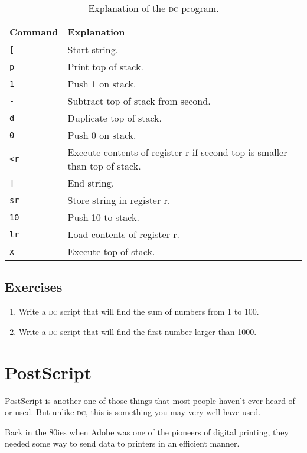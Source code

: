 \documentclass[a4paper,twocolumn]{article}
\begin{document}
\begin{table}[!h]
\centering
\caption{Explanation of the \textsc{dc} program.}\label{tlb:dcloop}
\begin{tabular}{@{}lp{5.7cm}@{}}
\toprule
Command & Explanation \\
\midrule
\verb|[| & Start string.\\
\verb|p| & Print top of stack.\\
\verb|1| & Push 1 on stack.\\
\verb|-| & Subtract top of stack from second.\\
\verb|d| & Duplicate top of stack.\\
\verb|0| & Push 0 on stack.\\
\verb|<r| & Execute contents of register r if second top is smaller than top of stack.\\
\verb|]| & End string.\\
\verb|sr| & Store string in register r.\\
\verb|10| & Push 10 to stack.\\
\verb|lr| & Load contents of register r.\\
\verb|x| & Execute top of stack.\\
\bottomrule
\end{tabular}
\end{table}

\subsection*{Exercises}

\begin{enumerate}
  \item Write a \textsc{dc} script that will find the sum of numbers from 1 to 100.
  \item Write a \textsc{dc} script that will find the first number larger than 1000.
\end{enumerate}

\section{PostScript}

PostScript is another one of those things that most people haven't ever heard of or used. But unlike \textsc{dc}, this is something you may very well have used.

Back in the 80ies when Adobe was one of the pioneers of digital printing, they needed some way to send data to printers in an efficient manner.
\end{document}
